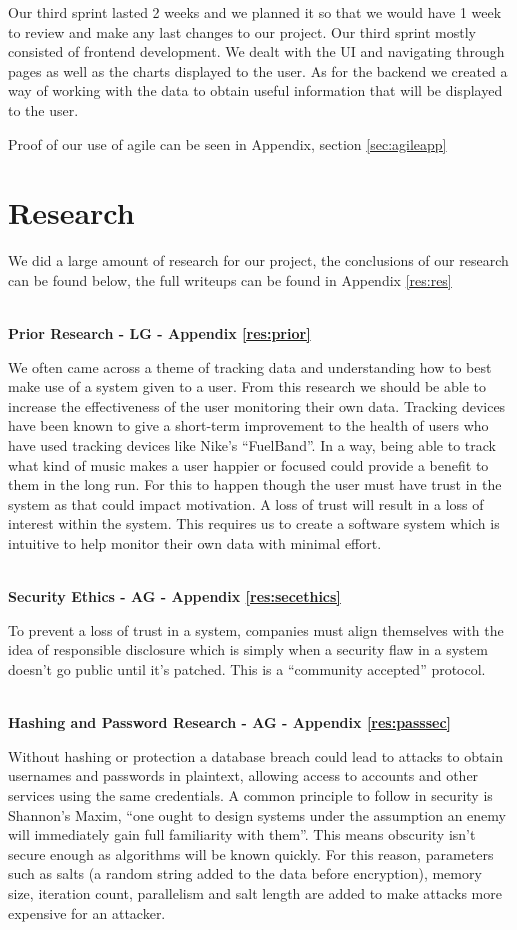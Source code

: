 \documentclass[10pt, notitlepage]{report}
\begin{document}
Our third sprint lasted 2 weeks and we planned it so that we would have 1 week to review and make any last changes to our project. Our third sprint mostly consisted of frontend development. We dealt with the UI and navigating through pages as well as the charts displayed to the user. As for the backend we created a way of working with the data to obtain useful information that will be displayed to the user. 

Proof of our use of agile can be seen in Appendix, section \ref{sec:agileapp}

\chapter{Research}

We did a large amount of research for our project, the conclusions of our research can be found below, the full writeups can be found in Appendix \ref{res:res}

\leavevmode \\
\textbf{Prior Research - LG - Appendix \ref{res:prior}}

We often came across a theme of tracking data and understanding how to best make use of a system given to a user. From this research we should be able to increase the effectiveness of the user monitoring their own data. Tracking devices have been known to give a short-term improvement to the health of users who have used tracking devices like Nike’s “FuelBand”. In a way, being able to track what kind of music makes a user happier or focused could provide a benefit to them in the long run. For this to happen though the user must have trust in the system as that could impact motivation. A loss of trust will result in a loss of interest within the system. This requires us to create a software system which is intuitive to help monitor their own data with minimal effort.

\leavevmode \\
\textbf{Security Ethics - AG - Appendix \ref{res:secethics}}

To prevent a loss of trust in a system, companies must align themselves with the idea of responsible disclosure which is simply when a security flaw in a system doesn’t go public until it’s patched. This is a “community accepted” protocol.

\leavevmode \\
\textbf{Hashing and Password Research - AG - Appendix \ref{res:passsec}}

Without hashing or protection a database breach could lead to attacks to obtain usernames and passwords in plaintext, allowing access to accounts and other services using the same 
credentials. A common principle to follow in security is Shannon’s Maxim, “one ought to design systems under the assumption an enemy will immediately gain full familiarity with them”. This means obscurity isn’t secure enough as algorithms will be known quickly. For this reason, parameters such as salts (a random string added to the data before encryption), memory size, iteration count, parallelism and salt length are added to make attacks more expensive for an attacker.
\end{document}
